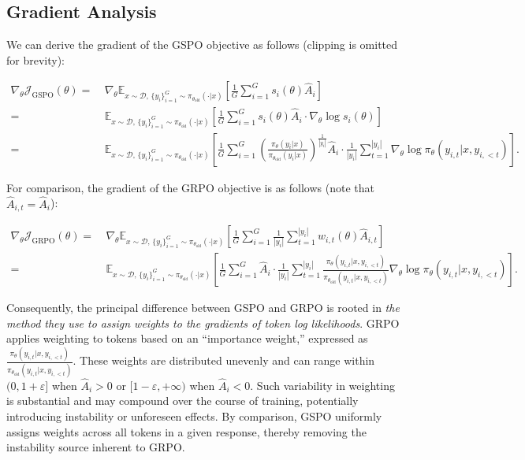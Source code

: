 \subsection{Gradient Analysis}
\label{subsec:gradient}

We can derive the gradient of the GSPO objective as follows (clipping is omitted for brevity):

\begin{align}
\nabla_{\theta} \mathcal{J}_\text{GSPO} (\theta)
=&\ 
\nabla_{\theta} \mathbb{E}_{ x \sim \mathcal{D},\, \{y_i\}_{i=1}^G \sim \pi_{\theta_\text{old}}( \cdot | x) }
\left[ 
\frac{1}{G} \sum_{i=1}^{G} s_{i}(\theta) \widehat{A}_{i}
\right] \\
= &\ 
\mathbb{E}_{ x \sim \mathcal{D},\, \{y_i\}_{i=1}^G \sim \pi_{\theta_\text{old}}( \cdot | x) }
\left[ 
\frac{1}{G} \sum_{i=1}^{G}
s_{i}(\theta) \widehat{A}_{i}
\cdot \nabla_{\theta} \log s_{i}(\theta)
\right] \\
=&\ 
\mathbb{E}_{ x \sim \mathcal{D},\, \{y_i\}_{i=1}^G \sim \pi_{\theta_\text{old}}( \cdot | x) }
\left[ 
\frac{1}{G} \sum_{i=1}^{G} 
\left( \frac{ \pi_{\theta} (y_i | x) }{ \pi_{\theta_\text{old}} (y_i | x)} \right)^{\frac{1}{|y_i|}} \widehat{A}_{i} 
\cdot \frac{1}{|y_i|} \sum_{t=1}^{|y_i|} \nabla_{\theta} \log \pi_{\theta} (y_{i,t} | x, y_{i,<t}) 
\right].
\label{equ:gspo_grad}
\end{align}

For comparison, the gradient of the GRPO objective is as follows (note that $\widehat{A}_{i,t} = \widehat{A}_{i}$):

\begin{align}
\nabla_{\theta} \mathcal{J}_\text{GRPO} (\theta) 
=&\ 
\nabla_{\theta} \mathbb{E}_{ x \sim \mathcal{D},\, \{y_i\}_{i=1}^G \sim \pi_{\theta_\text{old}}( \cdot | x) }
\left[ \frac{1}{G} \sum_{i=1}^{G} \frac{1}{|y_i|} \sum_{t=1}^{|y_i|} 
w_{i,t}(\theta) \widehat{A}_{i,t}
\right] \\
=&\
\mathbb{E}_{ x \sim \mathcal{D},\, \{y_i\}_{i=1}^G \sim \pi_{\theta_\text{old}}( \cdot | x) }
\left[ \frac{1}{G} \sum_{i=1}^{G} \widehat{A}_{i} 
\cdot \frac{1}{|y_i|} \sum_{t=1}^{|y_i|} 
\frac{ \pi_{\theta} (y_{i,t} | x, y_{i,<t}) }{ \pi_{\theta_\text{old}} (y_{i,t} | x,y_{i,<t})} 
\nabla_{\theta} \log \pi_{\theta} (y_{i,t} | x, y_{i,<t})  
\right].
\end{align}

Consequently, the principal difference between GSPO and GRPO is rooted in \textit{the method they use to assign weights to the gradients of token log likelihoods}. GRPO applies weighting to tokens based on an ``importance weight,'' expressed as $\frac{ \pi_{\theta} (y_{i,t} | x, y_{i,<t}) }{ \pi_{\theta_\text{old}} (y_{i,t} | x,y_{i,<t})}$. These weights are distributed unevenly and can range within $(0, 1+\varepsilon]$ when $\widehat{A}_{i} >0$ or $[1-\varepsilon, +\infty)$ when $\widehat{A}_{i} < 0$. Such variability in weighting is substantial and may compound over the course of training, potentially introducing instability or unforeseen effects. By comparison, GSPO uniformly assigns weights across all tokens in a given response, thereby removing the instability source inherent to GRPO.

